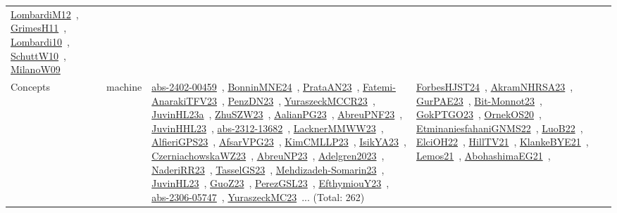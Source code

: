 {\begin{longtable}{lp{3cm}>{\raggedright\arraybackslash}p{6cm}>{\raggedright\arraybackslash}p{6cm}>{\raggedright\arraybackslash}p{8cm}}
\href{../works/LombardiM12.pdf}{LombardiM12}~\cite{LombardiM12}, \href{../works/GrimesH11.pdf}{GrimesH11}~\cite{GrimesH11}, \href{../works/Lombardi10.pdf}{Lombardi10}~\cite{Lombardi10}, \href{../works/SchuttW10.pdf}{SchuttW10}~\cite{SchuttW10}, \href{../works/MilanoW09.pdf}{MilanoW09}~\cite{MilanoW09}\\
Concepts & machine & \href{../works/abs-2402-00459.pdf}{abs-2402-00459}~\cite{abs-2402-00459}, \href{../works/BonninMNE24.pdf}{BonninMNE24}~\cite{BonninMNE24}, \href{../works/PrataAN23.pdf}{PrataAN23}~\cite{PrataAN23}, \href{../works/Fatemi-AnarakiTFV23.pdf}{Fatemi-AnarakiTFV23}~\cite{Fatemi-AnarakiTFV23}, \href{../works/PenzDN23.pdf}{PenzDN23}~\cite{PenzDN23}, \href{../works/YuraszeckMCCR23.pdf}{YuraszeckMCCR23}~\cite{YuraszeckMCCR23}, \href{../works/JuvinHL23a.pdf}{JuvinHL23a}~\cite{JuvinHL23a}, \href{../works/ZhuSZW23.pdf}{ZhuSZW23}~\cite{ZhuSZW23}, \href{../works/AalianPG23.pdf}{AalianPG23}~\cite{AalianPG23}, \href{../works/AbreuPNF23.pdf}{AbreuPNF23}~\cite{AbreuPNF23}, \href{../works/JuvinHHL23.pdf}{JuvinHHL23}~\cite{JuvinHHL23}, \href{../works/abs-2312-13682.pdf}{abs-2312-13682}~\cite{abs-2312-13682}, \href{../works/LacknerMMWW23.pdf}{LacknerMMWW23}~\cite{LacknerMMWW23}, \href{../works/AlfieriGPS23.pdf}{AlfieriGPS23}~\cite{AlfieriGPS23}, \href{../works/AfsarVPG23.pdf}{AfsarVPG23}~\cite{AfsarVPG23}, \href{../works/KimCMLLP23.pdf}{KimCMLLP23}~\cite{KimCMLLP23}, \href{../works/IsikYA23.pdf}{IsikYA23}~\cite{IsikYA23}, \href{../works/CzerniachowskaWZ23.pdf}{CzerniachowskaWZ23}~\cite{CzerniachowskaWZ23}, \href{../works/AbreuNP23.pdf}{AbreuNP23}~\cite{AbreuNP23}, \href{../works/Adelgren2023.pdf}{Adelgren2023}~\cite{Adelgren2023}, \href{../works/NaderiRR23.pdf}{NaderiRR23}~\cite{NaderiRR23}, \href{../works/TasselGS23.pdf}{TasselGS23}~\cite{TasselGS23}, \href{../works/Mehdizadeh-Somarin23.pdf}{Mehdizadeh-Somarin23}~\cite{Mehdizadeh-Somarin23}, \href{../works/JuvinHL23.pdf}{JuvinHL23}~\cite{JuvinHL23}, \href{../works/GuoZ23.pdf}{GuoZ23}~\cite{GuoZ23}, \href{../works/PerezGSL23.pdf}{PerezGSL23}~\cite{PerezGSL23}, \href{../works/EfthymiouY23.pdf}{EfthymiouY23}~\cite{EfthymiouY23}, \href{../works/abs-2306-05747.pdf}{abs-2306-05747}~\cite{abs-2306-05747}, \href{../works/YuraszeckMC23.pdf}{YuraszeckMC23}~\cite{YuraszeckMC23}... (Total: 262) & \href{../works/ForbesHJST24.pdf}{ForbesHJST24}~\cite{ForbesHJST24}, \href{../works/AkramNHRSA23.pdf}{AkramNHRSA23}~\cite{AkramNHRSA23}, \href{../works/GurPAE23.pdf}{GurPAE23}~\cite{GurPAE23}, \href{../works/Bit-Monnot23.pdf}{Bit-Monnot23}~\cite{Bit-Monnot23}, \href{../works/GokPTGO23.pdf}{GokPTGO23}~\cite{GokPTGO23}, \href{../works/OrnekOS20.pdf}{OrnekOS20}~\cite{OrnekOS20}, \href{../works/EtminaniesfahaniGNMS22.pdf}{EtminaniesfahaniGNMS22}~\cite{EtminaniesfahaniGNMS22}, \href{../works/LuoB22.pdf}{LuoB22}~\cite{LuoB22}, \href{../works/ElciOH22.pdf}{ElciOH22}~\cite{ElciOH22}, \href{../works/HillTV21.pdf}{HillTV21}~\cite{HillTV21}, \href{../works/KlankeBYE21.pdf}{KlankeBYE21}~\cite{KlankeBYE21}, \href{../works/Lemos21.pdf}{Lemos21}~\cite{Lemos21}, \href{../works/AbohashimaEG21.pdf}{AbohashimaEG21}~\cite{AbohashimaEG21}, 
\end{longtable}}
